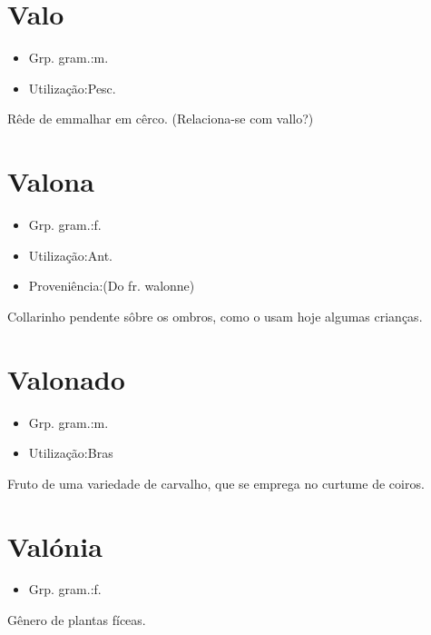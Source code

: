 \documentclass{article}
\begin{document}
\section{Valo}
\begin{itemize}
\item {Grp. gram.:m.}
\end{itemize}
\begin{itemize}
\item {Utilização:Pesc.}
\end{itemize}
Rêde de emmalhar em cêrco.
(Relaciona-se com \textunderscore vallo\textunderscore ?)
\section{Valona}
\begin{itemize}
\item {Grp. gram.:f.}
\end{itemize}
\begin{itemize}
\item {Utilização:Ant.}
\end{itemize}
\begin{itemize}
\item {Proveniência:(Do fr. \textunderscore walonne\textunderscore )}
\end{itemize}
Collarinho pendente sôbre os ombros, como o usam hoje algumas crianças.
\section{Valonado}
\begin{itemize}
\item {Grp. gram.:m.}
\end{itemize}
\begin{itemize}
\item {Utilização:Bras}
\end{itemize}
Fruto de uma variedade de carvalho, que se emprega no curtume de coiros.
\section{Valónia}
\begin{itemize}
\item {Grp. gram.:f.}
\end{itemize}
Gênero de plantas fíceas.
\end{document}
